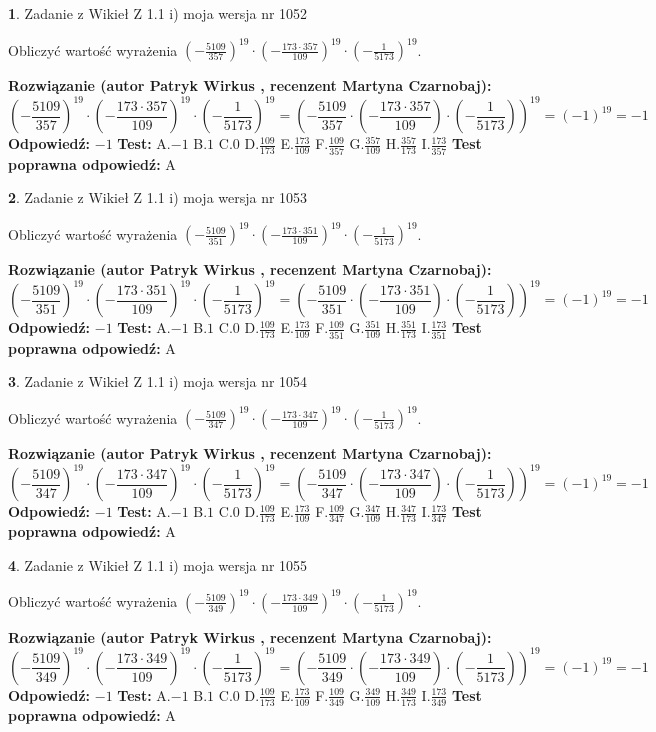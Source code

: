 \documentclass[12pt, a4paper]{article}
\theoremstyle{definition} %
\newtheorem{zad}{}
\newcommand{\zadStart}[1]{\begin{zad}#1\newline}
\newcommand{\zadStop}{\end{zad}}
\newcommand{\rozwStart}[2]{\noindent \textbf{Rozwiązanie (autor #1 , recenzent #2): }\newline}
\newcommand{\rozwStop}{\newline}
\newcommand{\odpStart}{\noindent \textbf{Odpowiedź:}\newline}
\newcommand{\odpStop}{\newline}
\newcommand{\testStart}{\noindent \textbf{Test:}\newline}
\newcommand{\testStop}{\newline}
\newcommand{\kluczStart}{\noindent \textbf{Test poprawna odpowiedź:}\newline}
\newcommand{\kluczStop}{\newline}
\begin{document}
\zadStart{Zadanie z Wikieł Z 1.1 i) moja wersja nr 1052}

Obliczyć wartość wyrażenia $(-\frac{5109}{357})^{19} \cdot (-\frac{173 \cdot 357}{109})^{19} \cdot (-\frac{1}{5173})^{19}$.
\zadStop
\rozwStart{Patryk Wirkus}{Martyna Czarnobaj}
$$(-\frac{5109}{357})^{19} \cdot (-\frac{173 \cdot 357}{109})^{19} \cdot (-\frac{1}{5173})^{19} = (-\frac{5109}{357} \cdot (-\frac{173 \cdot 357}{109}) \cdot (-\frac{1}{5173}))^{19} = (-1)^{19} = -1$$
\rozwStop
\odpStart
$-1$
\odpStop
\testStart
A.$-1$ B.$1$ C.$0$ D.$\frac{109}{173}$ E.$\frac{173}{109}$
F.$\frac{109}{357}$ G.$\frac{357}{109}$
H.$\frac{357}{173}$
I.$\frac{173}{357}$
\testStop
\kluczStart
A
\kluczStop



\zadStart{Zadanie z Wikieł Z 1.1 i) moja wersja nr 1053}

Obliczyć wartość wyrażenia $(-\frac{5109}{351})^{19} \cdot (-\frac{173 \cdot 351}{109})^{19} \cdot (-\frac{1}{5173})^{19}$.
\zadStop
\rozwStart{Patryk Wirkus}{Martyna Czarnobaj}
$$(-\frac{5109}{351})^{19} \cdot (-\frac{173 \cdot 351}{109})^{19} \cdot (-\frac{1}{5173})^{19} = (-\frac{5109}{351} \cdot (-\frac{173 \cdot 351}{109}) \cdot (-\frac{1}{5173}))^{19} = (-1)^{19} = -1$$
\rozwStop
\odpStart
$-1$
\odpStop
\testStart
A.$-1$ B.$1$ C.$0$ D.$\frac{109}{173}$ E.$\frac{173}{109}$
F.$\frac{109}{351}$ G.$\frac{351}{109}$
H.$\frac{351}{173}$
I.$\frac{173}{351}$
\testStop
\kluczStart
A
\kluczStop



\zadStart{Zadanie z Wikieł Z 1.1 i) moja wersja nr 1054}

Obliczyć wartość wyrażenia $(-\frac{5109}{347})^{19} \cdot (-\frac{173 \cdot 347}{109})^{19} \cdot (-\frac{1}{5173})^{19}$.
\zadStop
\rozwStart{Patryk Wirkus}{Martyna Czarnobaj}
$$(-\frac{5109}{347})^{19} \cdot (-\frac{173 \cdot 347}{109})^{19} \cdot (-\frac{1}{5173})^{19} = (-\frac{5109}{347} \cdot (-\frac{173 \cdot 347}{109}) \cdot (-\frac{1}{5173}))^{19} = (-1)^{19} = -1$$
\rozwStop
\odpStart
$-1$
\odpStop
\testStart
A.$-1$ B.$1$ C.$0$ D.$\frac{109}{173}$ E.$\frac{173}{109}$
F.$\frac{109}{347}$ G.$\frac{347}{109}$
H.$\frac{347}{173}$
I.$\frac{173}{347}$
\testStop
\kluczStart
A
\kluczStop



\zadStart{Zadanie z Wikieł Z 1.1 i) moja wersja nr 1055}

Obliczyć wartość wyrażenia $(-\frac{5109}{349})^{19} \cdot (-\frac{173 \cdot 349}{109})^{19} \cdot (-\frac{1}{5173})^{19}$.
\zadStop
\rozwStart{Patryk Wirkus}{Martyna Czarnobaj}
$$(-\frac{5109}{349})^{19} \cdot (-\frac{173 \cdot 349}{109})^{19} \cdot (-\frac{1}{5173})^{19} = (-\frac{5109}{349} \cdot (-\frac{173 \cdot 349}{109}) \cdot (-\frac{1}{5173}))^{19} = (-1)^{19} = -1$$
\rozwStop
\odpStart
$-1$
\odpStop
\testStart
A.$-1$ B.$1$ C.$0$ D.$\frac{109}{173}$ E.$\frac{173}{109}$
F.$\frac{109}{349}$ G.$\frac{349}{109}$
H.$\frac{349}{173}$
I.$\frac{173}{349}$
\testStop
\kluczStart
A
\kluczStop
\end{document}
